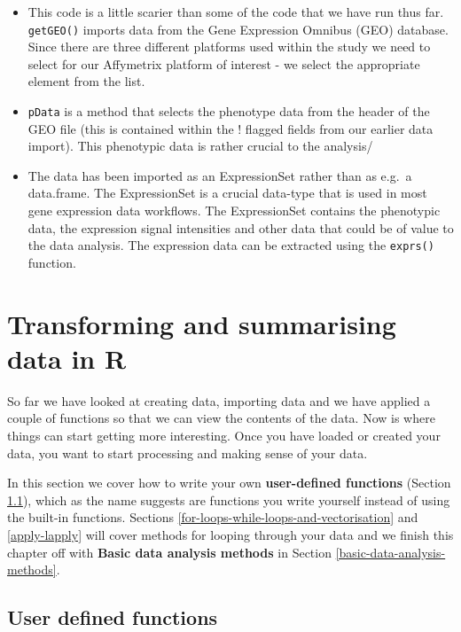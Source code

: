 \documentclass[a4paper]{book}
\begin{document}
\begin{itemize}
\item
  This code is a little scarier than some of the code that we have run
  thus far. \texttt{getGEO()} imports data from the Gene Expression
  Omnibus (GEO) database. Since there are three different platforms used
  within the study we need to select for our Affymetrix platform of
  interest - we select the appropriate element from the list.
\item
  \texttt{pData} is a method that selects the phenotype data from the
  header of the GEO file (this is contained within the ! flagged fields
  from our earlier data import). This phenotypic data is rather crucial
  to the analysis/
\item
  The data has been imported as an ExpressionSet rather than as e.g.~a
  data.frame. The ExpressionSet is a crucial data-type that is used in
  most gene expression data workflows. The ExpressionSet contains the
  phenotypic data, the expression signal intensities and other data that
  could be of value to the data analysis. The expression data can be
  extracted using the \texttt{exprs()} function.
\end{itemize}

\chapter{Transforming and summarising data in
R}\label{transforming-and-summarising-data-in-r}

So far we have looked at creating data, importing data and we have
applied a couple of functions so that we can view the contents of the
data. Now is where things can start getting more interesting. Once you
have loaded or created your data, you want to start processing and
making sense of your data.

In this section we cover how to write your own \textbf{user-defined
functions} (Section \ref{user-defined-functions}), which as the name
suggests are functions you write yourself instead of using the built-in
functions. Sections \ref{for-loops-while-loops-and-vectorisation} and
\ref{apply-lapply} will cover methods for looping through your data and
we finish this chapter off with \textbf{Basic data analysis methods} in
Section \ref{basic-data-analysis-methods}.

\section{User defined functions}\label{user-defined-functions}
\end{document}
